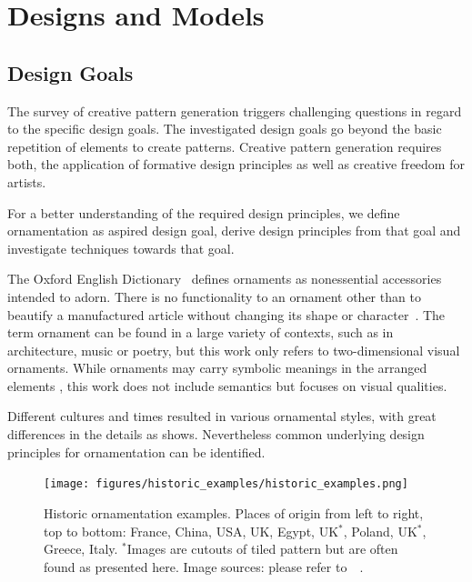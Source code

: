 
\section{Designs and Models}


\subsection{Design Goals}
\label{sec:design_goals}



The survey of creative pattern generation triggers challenging questions in regard to the specific design goals. The investigated design goals go beyond the basic repetition of elements to create patterns. Creative pattern generation requires both, the application of formative design principles as well as creative freedom for artists.

For a better understanding of the required design principles, we define ornamentation as aspired design goal, derive design principles from that goal and investigate techniques towards that goal.

The Oxford English Dictionary~\cite{oed_2017} defines ornaments as nonessential accessories intended to adorn. There is no functionality to an ornament other than to beautify a manufactured article without changing its shape or character~\cite{ward_1896_tpo}. The term ornament can be found in a large variety of contexts, such as in architecture, music or poetry, but this work only refers to two-dimensional visual ornaments. While ornaments may carry symbolic meanings in the arranged elements \cite{wornum_1896_aof}, this work does not include semantics but focuses on visual qualities.

Different cultures and times resulted in various ornamental styles, with great differences in the details as  shows. Nevertheless common underlying design principles for ornamentation can be identified.

\begin{figure}
       \texttt{[image: figures/historic\_examples/historic\_examples.png]}
        \caption[Historic ornamentation examples]{\label{fig:historic_examples} Historic ornamentation examples. Places of origin from left to right, top to bottom:  France, China, USA, UK, Egypt, UK$^{*}$, Poland, UK$^{*}$, Greece, Italy. $^{*}$Images are cutouts of tiled pattern but are often found as presented here. Image sources: please refer to~~.}
\end{figure}

